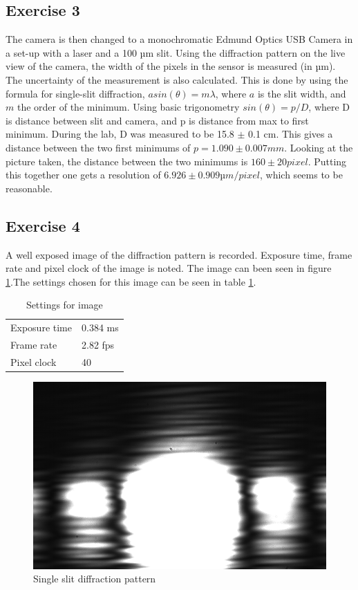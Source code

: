 \documentclass[a4paper,12pt]{article}
\begin{document}
\subsection{Exercise 3}
The camera is then changed to a monochromatic Edmund Optics USB Camera in a set-up with a laser and a 100 µm slit. 
Using the diffraction pattern on the live view of the camera, the width of the pixels in the sensor is measured (in µm). The uncertainty of the measurement is also calculated. 
This is done by using the formula for single-slit diffraction, $asin(\theta) = m\lambda$, where $a$ is the slit width, and $m$ the order of the minimum. Using basic trigonometry $sin(\theta)=p/D$, where D is distance between slit and camera, and p is distance from max to first minimum. During the lab, D was measured to be 15.8 $\pm$ 0.1 cm. This gives a distance between the two first minimums of $p= 1.090 \pm 0.007 mm$. Looking at the picture taken, the distance between the two minimums is $160 \pm 20 pixel$. Putting this together one gets a resolution of $6.926 \pm 0.909 µm/pixel$, which seems to be reasonable.

\subsection{Exercise 4}
A well exposed image of the diffraction pattern is recorded. Exposure time, frame rate and pixel clock of the image is noted. The image can been seen in figure \ref{fig:single slit}.The settings chosen for this image can be seen in table \ref{tab:Settings for image}.\\
\begin{table}[H]
\centering
\begin{tabular}{|l|l|}
\hline
Exposure time & 0.384 ms\\
Frame rate & 2.82 fps\\
Pixel clock & 40\\
\hline
\end{tabular}
\caption{Settings for image}\label{tab:Settings for image}
\end{table}

\begin{figure}[H]
\centering
\includegraphics[width=\textwidth]{CCD_single_slit}
\caption{Single slit diffraction pattern}\label{fig:single slit}
\end{figure}
\end{document}
